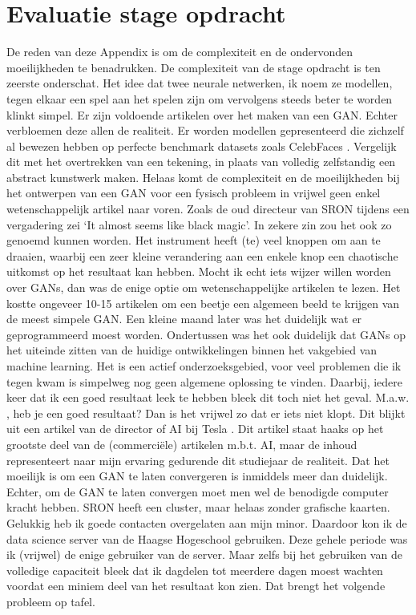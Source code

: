 \chapter{Evaluatie stage opdracht}
De reden van deze Appendix is om de complexiteit en de ondervonden moeilijkheden te benadrukken.
De complexiteit van de stage opdracht is ten zeerste onderschat. Het idee dat twee neurale netwerken, ik noem ze modellen, tegen elkaar een spel aan het spelen zijn om vervolgens steeds beter te worden klinkt simpel. Er zijn voldoende artikelen over het maken van een GAN. Echter verbloemen deze allen de realiteit. Er worden modellen gepresenteerd die zichzelf al bewezen hebben op perfecte benchmark datasets zoals CelebFaces \cite{liu2018large}. Vergelijk dit met het overtrekken van een tekening, in plaats van volledig zelfstandig een abstract kunstwerk maken. 
Helaas komt de complexiteit en de moeilijkheden bij het ontwerpen van een GAN voor een fysisch probleem in vrijwel geen enkel wetenschappelijk artikel naar voren. Zoals de oud directeur van SRON tijdens een vergadering zei ‘It almost seems like black magic’. In zekere zin zou het ook zo genoemd kunnen worden. Het instrument heeft (te) veel knoppen om aan te draaien, waarbij een zeer kleine verandering aan een enkele knop een chaotische uitkomst op het resultaat kan hebben.
Mocht ik echt iets wijzer willen worden over GANs, dan was de enige optie om wetenschappelijke artikelen te lezen. Het kostte ongeveer 10-15 artikelen om een beetje een algemeen beeld te krijgen van de meest simpele GAN. Een kleine maand later was het duidelijk wat er geprogrammeerd moest worden. Ondertussen was het ook duidelijk dat GANs op het uiteinde zitten van de huidige ontwikkelingen binnen het vakgebied van machine learning. Het is een actief onderzoeksgebied, voor veel problemen die ik tegen kwam is simpelweg nog geen algemene oplossing te vinden. Daarbij, iedere keer dat ik een goed resultaat leek te hebben bleek dit toch niet het geval. M.a.w. , heb je een goed resultaat? Dan is het vrijwel zo dat er iets niet klopt. Dit blijkt uit een artikel van de director of AI bij Tesla \cite{a_recipe_for_training_neural_networks}. Dit artikel staat haaks op het grootste deel van de (commerciële) artikelen m.b.t. AI, maar de inhoud representeert naar mijn ervaring gedurende dit studiejaar de realiteit. 
Dat het moeilijk is om een GAN te laten convergeren is inmiddels meer dan duidelijk. Echter, om de GAN te laten convergen moet men wel de benodigde computer kracht hebben. SRON heeft een cluster, maar helaas zonder grafische kaarten. Gelukkig heb ik goede contacten overgelaten aan mijn minor. Daardoor kon ik de data science server van de Haagse Hogeschool gebruiken. Deze gehele periode was ik (vrijwel) de enige gebruiker van de server. Maar zelfs bij het gebruiken van de volledige capaciteit bleek dat ik dagdelen tot meerdere dagen moest wachten voordat een miniem deel van het resultaat kon zien. Dat brengt het volgende probleem op tafel. 
